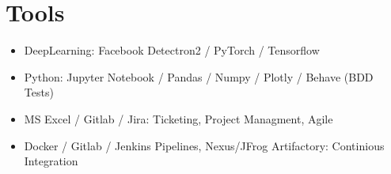 \documentclass[a4paper]{friggeri-cv} %
\begin{document}

\section{Tools}

\begin{itemize}
\item DeepLearning: Facebook Detectron2 / PyTorch / Tensorflow
\item Python: Jupyter Notebook / Pandas / Numpy / Plotly / Behave (BDD Tests)
\item MS Excel / Gitlab / Jira: Ticketing, Project Managment, Agile 
\item Docker / Gitlab / Jenkins Pipelines, Nexus/JFrog Artifactory:  Continious Integration
\end{itemize}



\end{document}
